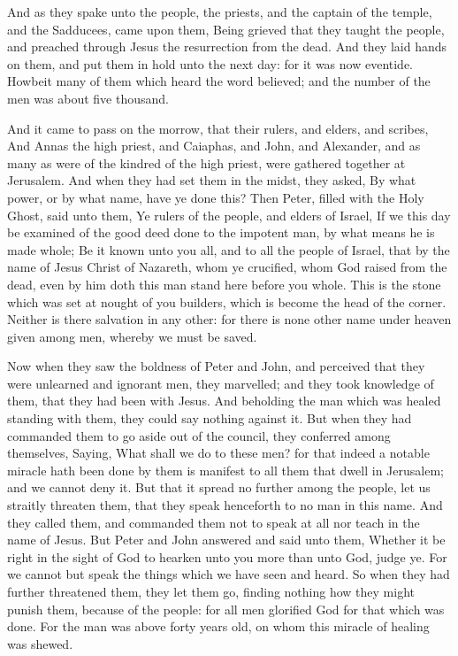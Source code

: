  And as they spake unto the people, the priests, and the
captain of the temple, and the Sadducees, came upon them, 
Being grieved that they taught the people, and preached through Jesus
the resurrection from the dead.  And they laid hands on
them, and put them in hold unto the next day: for it was now eventide.
 Howbeit many of them which heard the word believed; and
the number of the men was about five thousand.

 And it came to pass on the morrow, that their rulers, and
elders, and scribes,  And Annas the high priest, and
Caiaphas, and John, and Alexander, and as many as were of the kindred of
the high priest, were gathered together at Jerusalem.  And
when they had set them in the midst, they asked, By what power, or by
what name, have ye done this?  Then Peter, filled with the
Holy Ghost, said unto them, Ye rulers of the people, and elders of
Israel,  If we this day be examined of the good deed done
to the impotent man, by what means he is made whole;  Be
it known unto you all, and to all the people of Israel, that by the name
of Jesus Christ of Nazareth, whom ye crucified, whom God raised from the
dead, even by him doth this man stand here before you whole.
 This is the stone which was set at nought of you
builders, which is become the head of the corner. 
Neither is there salvation in any other: for there is none other name
under heaven given among men, whereby we must be saved.

 Now when they saw the boldness of Peter and John, and
perceived that they were unlearned and ignorant men, they marvelled; and
they took knowledge of them, that they had been with Jesus.
 And beholding the man which was healed standing with
them, they could say nothing against it.  But when they
had commanded them to go aside out of the council, they conferred among
themselves,  Saying, What shall we do to these men? for
that indeed a notable miracle hath been done by them is manifest to all
them that dwell in Jerusalem; and we cannot deny it.  But
that it spread no further among the people, let us straitly threaten
them, that they speak henceforth to no man in this name. 
And they called them, and commanded them not to speak at all nor teach
in the name of Jesus.  But Peter and John answered and
said unto them, Whether it be right in the sight of God to hearken unto
you more than unto God, judge ye.  For we cannot but
speak the things which we have seen and heard.  So when
they had further threatened them, they let them go, finding nothing how
they might punish them, because of the people: for all men glorified God
for that which was done.  For the man was above forty
years old, on whom this miracle of healing was shewed.

